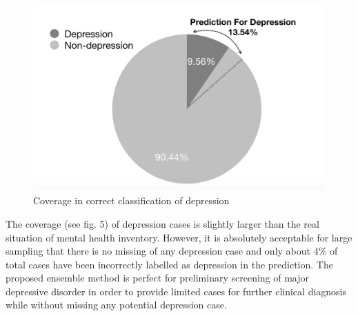 \documentclass[12pt]{article}
\begin{document}
\begin{figure}[h]
\includegraphics[width=1\textwidth]{coverage.png}
\caption{Coverage in correct classification of depression} \label{fig5}
\end{figure}
The coverage (see fig. 5) of depression cases is slightly larger than the real situation of mental health inventory. However, it is absolutely acceptable for large sampling that there is no missing of any depression case and only about 4\% of total cases have been incorrectly labelled as depression in the prediction. The proposed ensemble method is perfect for preliminary screening of major depressive disorder in order to provide limited cases for further clinical diagnosis while without missing any potential depression case. 
\\
\end{document}
